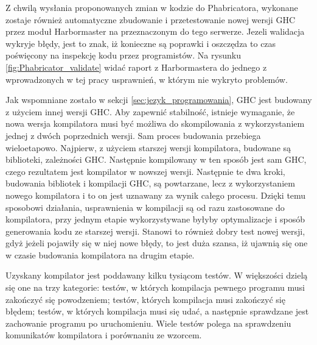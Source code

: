 Z chwilą wysłania proponowanych zmian w kodzie do Phabricatora, wykonane zostaje również automatyczne zbudowanie i przetestowanie nowej wersji GHC przez moduł Harbormaster na przeznaczonym do tego serwerze. Jezeli walidacja wykryje błędy, jest to znak, iż konieczne są poprawki i oszczędza to czas poświęcony na inspekcję kodu przez programistów. Na rysunku \ref{fig:Phabricator_validate} widać raport z Harbormastera do jednego z wprowadzonych w tej pracy usprawnień, w którym nie wykryto problemów.

Jak wspomniane zostało w sekcji \ref{sec:jezyk_programowania}, GHC jest budowany z użyciem innej wersji GHC. Aby zapewnić stabilność, istnieje wymaganie, że nowa wersja kompilatora musi być możliwa do skompilowania z wykorzystaniem jednej z dwóch poprzednich wersji\cite{WikiFixingBugs}. Sam proces budowania przebiega wieloetapowo. Najpierw, z użyciem starszej wersji kompilatora, budowane są biblioteki, zależności GHC. Następnie kompilowany w ten sposób jest sam GHC, czego rezultatem jest kompilator w nowszej wersji. Następnie te dwa kroki, budowania bibliotek i kompilacji GHC, są powtarzane, lecz z wykorzystaniem nowego kompilatora i to on jest uznawany za wynik całego procesu\cite{WikiBuildSystem}. Dzięki temu sposobowi działania, usprawnienia w kompilacji są od razu zastosowane do kompilatora, przy jednym etapie wykorzystywane byłyby optymalizacje i sposób generowania kodu ze starszej wersji. Stanowi to również dobry test nowej wersji, gdyż jeżeli pojawiły się w niej nowe błędy, to jest duża szansa, iż ujawnią się one w czasie budowania kompilatora na drugim etapie.

Uzyskany kompilator jest poddawany kilku tysiącom testów. W większości dzielą się one na trzy kategorie: testów, w których kompilacja pewnego programu musi zakończyć się powodzeniem; testów, których kompilacja musi zakończyć się błędem; testów, w których kompilacja musi się udać, a następnie sprawdzane jest zachowanie programu po uruchomieniu. Wiele testów polega na sprawdzeniu komunikatów kompilatora i porównaniu ze wzorcem.
